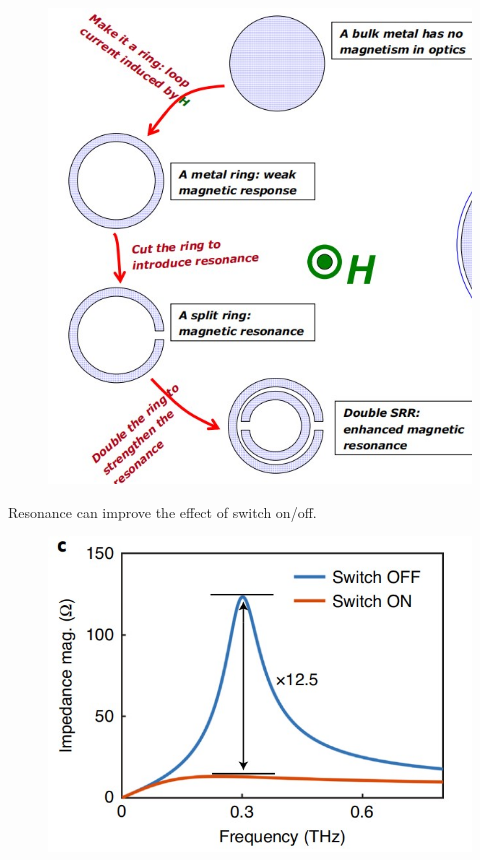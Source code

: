 \documentclass[]{article}
\begin{document}
	\begin{figure}[H]
		\centering
		\includegraphics[scale=0.8]{Fig/16.jpg}
	\end{figure}

	\par Resonance can improve the effect of switch on/off.
	
	\begin{figure}[H]
		\centering
		\includegraphics[scale=0.8]{Fig/17.jpg}
	\end{figure}
	
\end{document}
